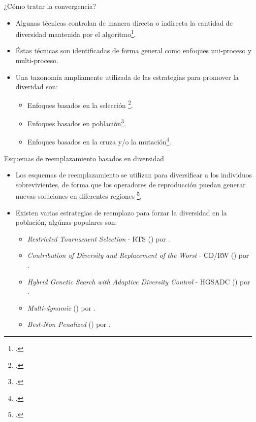 \documentclass{beamer}
\begin{document}
\begin{frame}{¿Cómo tratar la convergencia?}
\begin{itemize}
\justifying
    \item Algunas técnicas controlan de manera directa o indirecta la cantidad de diversidad mantenida por el algoritmo\footcite{Crepinsek:13}.
    \item Éstas técnicas son identificadas de forma general como enfoques uni-proceso y multi-proceso.
    \item Una taxonomía ampliamente utilizada de las estrategias para promover la diveridad son:
    \begin{itemize}
        \item Enfoques basados en la selección \footcite{eiben2003introduction}.
        \item Enfoques basados en población\footcite{alba2005parallel}.
        \item Enfoques basados en la cruza y/o la mutación\footcite{yu2014differential}.
    \end{itemize}
\end{itemize}
\end{frame}


\begin{frame}{Esquemas de reemplazamiento basados en diversidad}
\begin{itemize}
    \item Los esquemas de reemplazamiento se utilizan para diversificar a los individuos sobrevivientes, de forma que los operadores de reproducción puedan generar nuevas soluciones en diferentes regiones \footcite{eiben1998evolutionary}.
    \item Existen varias estrategias de reemplazo para forzar la diversidad en la población, algúnas populares son:
    \begin{itemize}
    \scriptsize
       \item \textit{Restricted Tournament Selection} - RTS (\citeyear{harik1995finding}) por \citeauthor{harik1995finding}.
       \item \textit{Contribution of Diversity and Replacement of the Worst} - CD/RW (\citeyear{lozano2008replacement}) por \citeauthor{lozano2008replacement}.
       \item \textit{Hybrid Genetic Search with Adaptive Diversity Control} - HGSADC (\citeyear{vidal2013hybrid}) por \citeauthor{vidal2013hybrid}.
       \item \textit{Multi-dynamic} (\citeyear{segura2016novel}) por \citeauthor{segura2016novel}. 
       \item \textit{Best-Non Penalized} (\citeyear{romero2018memetic}) por \citeauthor{romero2018memetic}.
    \end{itemize}
\end{itemize}
\end{frame}
\end{document}
